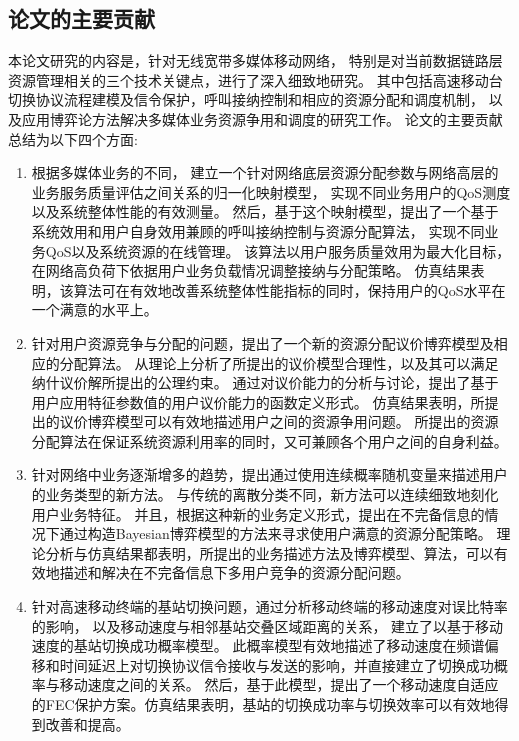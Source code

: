 \subsection{论文的主要贡献}
本论文研究的内容是，针对无线宽带多媒体移动网络，
特别是对当前数据链路层资源管理相关的三个技术关键点，进行了深入细致地研究。
其中包括高速移动台切换协议流程建模及信令保护，呼叫接纳控制和相应的资源分配和调度机制，
以及应用博弈论方法解决多媒体业务资源争用和调度的研究工作。
论文的主要贡献总结为以下四个方面:
\begin{enumerate}[(1)]

\item 
根据多媒体业务的不同，
建立一个针对网络底层资源分配参数与网络高层的业务服务质量评估之间关系的归一化映射模型，
实现不同业务用户的QoS测度以及系统整体性能的有效测量。
然后，基于这个映射模型，提出了一个基于系统效用和用户自身效用兼顾的呼叫接纳控制与资源分配算法，
实现不同业务QoS以及系统资源的在线管理。
该算法以用户服务质量效用为最大化目标，在网络高负荷下依据用户业务负载情况调整接纳与分配策略。
仿真结果表明，该算法可在有效地改善系统整体性能指标的同时，保持用户的QoS水平在一个满意的水平上。

\item 
针对用户资源竞争与分配的问题，提出了一个新的资源分配议价博弈模型及相应的分配算法。
从理论上分析了所提出的议价模型合理性，以及其可以满足纳什议价解所提出的公理约束。
通过对议价能力的分析与讨论，提出了基于用户应用特征参数值的用户议价能力的函数定义形式。
仿真结果表明，所提出的议价博弈模型可以有效地描述用户之间的资源争用问题。
所提出的资源分配算法在保证系统资源利用率的同时，又可兼顾各个用户之间的自身利益。

\item 
针对网络中业务逐渐增多的趋势，提出通过使用连续概率随机变量来描述用户的业务类型的新方法。
与传统的离散分类不同，新方法可以连续细致地刻化用户业务特征。
并且，根据这种新的业务定义形式，提出在不完备信息的情况下通过构造Bayesian博弈模型的方法来寻求使用户满意的资源分配策略。
理论分析与仿真结果都表明，所提出的业务描述方法及博弈模型、算法，可以有效地描述和解决在不完备信息下多用户竞争的资源分配问题。

\item 
针对高速移动终端的基站切换问题，通过分析移动终端的移动速度对误比特率的影响，
以及移动速度与相邻基站交叠区域距离的关系，
建立了以基于移动速度的基站切换成功概率模型。
此概率模型有效地描述了移动速度在频谱偏移和时间延迟上对切换协议信令接收与发送的影响，并直接建立了切换成功概率与移动速度之间的关系。
然后，基于此模型，提出了一个移动速度自适应的FEC保护方案。仿真结果表明，基站的切换成功率与切换效率可以有效地得到改善和提高。
\end{enumerate}

